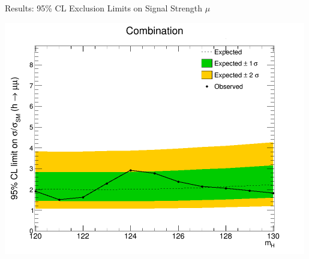 \documentclass[pdf, 9pt]{beamer}
\begin{document}
  \begin{frame}{Results: 95\% CL Exclusion Limits on Signal Strength $\mu$}
    \begin{center}
      \vspace{-0.3cm}
      \includegraphics[width=0.99\textwidth, height=0.99\textheight]{figs/higgs/limits/bdt_110to160_withSys_limits_1906/limitsByCategory__combTotal__TripleGaus.png}
    \end{center}
  \end{frame}

{ %
    \begin{frame}[plain]
     \end{frame}
}
\end{document}

